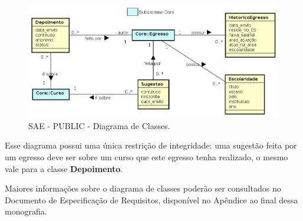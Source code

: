 \begin{figure}[h]
	\centering
	\includegraphics[width=1\textwidth]{figuras/requisitos/diagrama-classe-public}
	\caption{SAE - PUBLIC - Diagrama de Classes.}
	\label{fig-requisitos-public-diagrama-classes}
\end{figure}


Esse diagrama possui uma única restrição de integridade: uma sugestão feita por um egresso deve ser sobre um curso que este egresso tenha realizado, o mesmo vale para a classe \textbf{Depoimento}.

Maiores informações sobre o diagrama de classes poderão ser consultados no Documento de Especificação de Requisitos, disponível no Apêndice ao final dessa monografia.